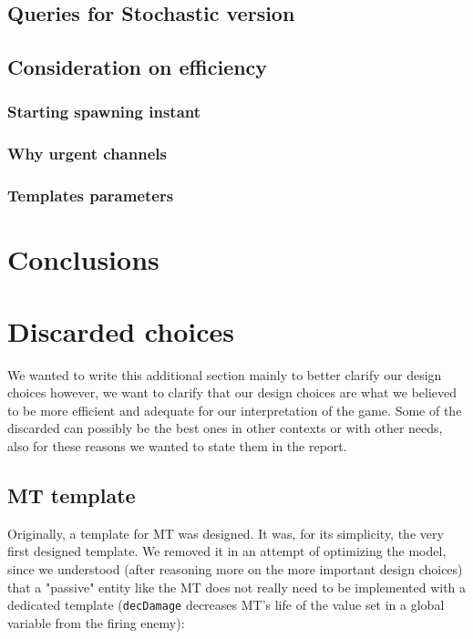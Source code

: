 \documentclass[
10pt, %
a4paper, %
oneside, %
headinclude,footinclude, %
BCOR5mm, %
]{scrartcl}
\begin{document}
	\subsection{Queries for Stochastic version}
	\subsection{Consideration on efficiency}
	\subsubsection{Starting spawning instant}
	\subsubsection{Why urgent channels}
	\subsubsection{Templates parameters}
	
	
	\section{Conclusions}
	
	\renewcommand{\refname}{\spacedlowsmallcaps{References}} %
	
	
	
	
	\appendix
	\section{Discarded choices}
	We wanted to write this additional section mainly to better clarify our design choices however, we want to clarify that our design choices are what we believed to be more efficient and adequate for our interpretation of the game. Some of the discarded can possibly be the best ones in other contexts or with other needs, also for these reasons we wanted to state them in the report.
	\subsection{MT template}
	Originally, a template for MT was designed. It was, for its simplicity, the very first designed template. We removed it in an attempt of optimizing the model, since we understood (after reasoning more on the more important design choices) that a "passive" entity like the MT does not really need to be implemented with a dedicated template (\texttt{decDamage} decreases MT's life of the value set in a global variable from the firing enemy):
	
\end{document}

